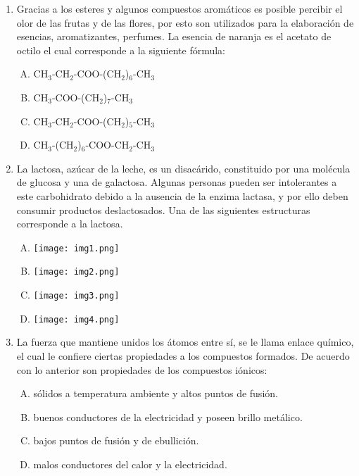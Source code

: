 
\begin{enumerate}
\item  Gracias a los esteres y algunos compuestos aromáticos es posible percibir el olor de las frutas y de las flores, por esto son utilizados para la elaboración de esencias, aromatizantes, perfumes. La esencia de naranja es el acetato de octilo el cual corresponde a la siguiente fórmula: \label{jenn-1}


\begin{enumerate}[(A)]
\item CH$_3$-CH$_2$-COO-(CH$_2$)$_6$-CH$_3$
\item CH$_3$-COO-(CH$_2$)$_7$-CH$_3$
\item CH$_3$-CH$_2$-COO-(CH$_2$)$_5$-CH$_3$
\item CH$_3$-(CH$_2$)$_6$-COO-CH$_2$-CH$_3$
\end{enumerate}




\item La lactosa, azúcar de la leche, es un disacárido, constituido por una molécula de glucosa y una de galactosa. Algunas personas pueden ser intolerantes a este carbohidrato debido a la ausencia de la enzima lactasa, y por ello deben consumir productos deslactosados. Una de las siguientes estructuras corresponde a la lactosa. \label{jenn-2}


\begin{enumerate}[(A)]
\item \texttt{[image: img1.png]}
\item \texttt{[image: img2.png]}
\item \texttt{[image: img3.png]}\\
\item \texttt{[image: img4.png]}
\end{enumerate}




\item  La fuerza que mantiene unidos los átomos entre sí, se le llama enlace químico, el cual le confiere ciertas propiedades a los compuestos formados. De acuerdo con lo anterior son propiedades de los compuestos iónicos:\label{jenn-3}


\begin{enumerate}[(A)]
\item   sólidos a temperatura ambiente y altos puntos de fusión.
\item buenos conductores de la electricidad y poseen brillo metálico.
\item bajos puntos de fusión y de ebullición.
\item malos conductores del calor y la electricidad.
\end{enumerate}



\end{enumerate}
